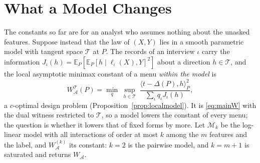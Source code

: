 \documentclass{article}
\newcommand{\E}{\mathbb{E}}
\newcommand{\A}{\mathcal A}
\begin{document}
\section{What a Model Changes}\label{sec:model}
The constants so far are for an analyst who assumes nothing about the unasked features. Suppose instead that the law of $(X,Y)$ lies in a smooth parametric model with tangent space $\mathcal T$ at $P$. The records of an interview $\iota$ carry the information $J_\iota(h)=\E_P[\E_P[h\mid\ell_\iota(X),Y]^2]$ about a direction $h\in\mathcal T$, and the local asymptotic minimax constant of a menu \emph{within the model} is
\begin{equation}
 W^{\mathcal T}_\A(P)=\min_q\ \sup_{h\in\mathcal T}\ \frac{\langle t-\Delta(P),h\rangle_P^2}{\sum_\iota q_\iota J_\iota(h)},\label{eq:mainWT}
\end{equation}
a $c$-optimal design problem (Proposition~\ref{prop:localmodel}). It is \eqref{eq:mainW} with the dual witness restricted to $\mathcal T$, so a model lowers the constant of every menu; the question is whether it lowers that of fixed forms by more. Let $\mathcal M_k$ be the log-linear model with all interactions of order at most $k$ among the $m$ features and the label, and $W^{(k)}_\A$ its constant: $k=2$ is the pairwise model, and $k=m+1$ is saturated and returns $W_\A$.
\end{document}
